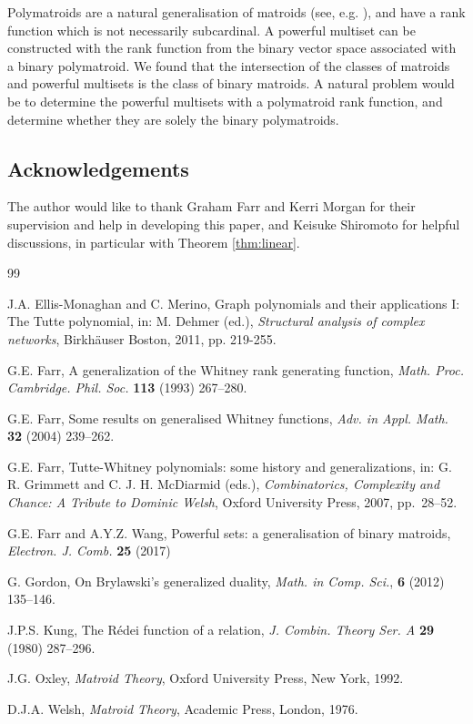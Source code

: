 \documentclass[10pt]{article}
\theoremstyle{definition}
\begin{document}
    Polymatroids are a natural generalisation of matroids (see, e.g. \cite[ \S 18.2]{welsh76}), and have a rank function which is not necessarily subcardinal. A powerful multiset can be constructed with the rank function from the binary vector space associated with a binary polymatroid. We found that the intersection of the classes of matroids and powerful multisets is the class of binary matroids. A natural problem would be to determine the powerful multisets with a polymatroid rank function, and determine whether they are solely the binary polymatroids.

    \subsection*{Acknowledgements} 
    The author would like to thank Graham Farr and Kerri Morgan for their supervision and help in developing this paper, and Keisuke Shiromoto for helpful discussions, in particular with Theorem \ref{thm:linear}.
	
	\begin{thebibliography}{99}

        J.A. Ellis-Monaghan and C. Merino,
        Graph polynomials and their applications I: The Tutte polynomial,
        in: M. Dehmer (ed.),
        \textit{Structural analysis of complex networks}, Birkh{\"a}user Boston, 2011, pp. 219-255.	
		
		G.E. Farr,
		A generalization of the Whitney rank generating function,
		\textit{Math. Proc. Cambridge. Phil. Soc.} \textbf{113} (1993) 267--280.
		
		G.E. Farr,
		Some results on generalised Whitney functions,
		\textit{Adv. in Appl. Math.} \textbf{32} (2004) 239--262.
		
		G.E. Farr,
		Tutte-Whitney polynomials: some history and generalizations,
		in: G. R. Grimmett and C. J. H. McDiarmid (eds.),
		\textit{Combinatorics, Complexity and Chance: A Tribute to
		Dominic Welsh},
		Oxford University Press, 2007, pp.\ 28--52.
		
		G.E. Farr and A.Y.Z. Wang,
		Powerful sets: a generalisation of binary matroids,
		\textit{Electron. J. Comb.} \textbf{25} (2017)
		
		G. Gordon,
		On {B}rylawski{'}s generalized duality,
        \textit{Math. in Comp. Sci.}, \textbf{6} (2012) 135--146.
		
		J.P.S. Kung,
		The {R}\'edei function of a relation,
		\textit{J. Combin. Theory Ser. A} \textbf{29} (1980) 287--296.
		
		J.G. Oxley, \textit{Matroid Theory}, Oxford University Press,
		New York, 1992.

		D.J.A. Welsh,
		\textit{Matroid Theory},
		Academic Press, London, 1976.
		
	\end{thebibliography}
	
	
\end{document}
